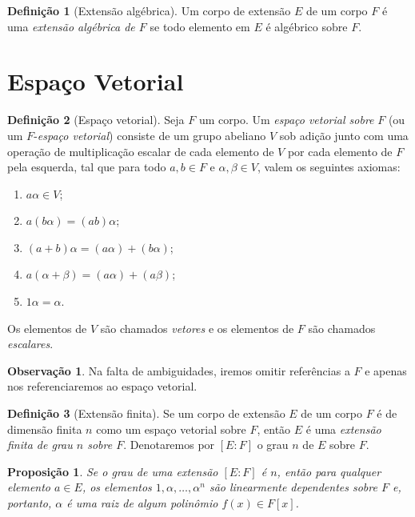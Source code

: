 \documentclass[a4paper,12pt]{report}
\theoremstyle{plain}
\newtheorem{proposicao}{Proposição}[section]
\theoremstyle{definition}
\newtheorem{definicao}{Definição}[section]
\newtheorem{observacao}{Observação}[section]
\begin{document}
\begin{definicao}[Extensão algébrica]
	Um corpo de extensão $E$ de um corpo $F$ é uma \emph{extensão algébrica de $F$} se todo elemento em $E$ é algébrico sobre $F$.
\end{definicao}

\section{Espaço Vetorial}

 \begin{definicao}[Espaço vetorial]
	Seja $F$ um corpo. Um \emph{espaço vetorial sobre} $F$ (ou um $F$-\emph{espaço vetorial}) consiste de um grupo abeliano $V$ sob adição junto com uma operação de multiplicação escalar de cada elemento de $V$ por cada elemento de $F$ pela esquerda, tal que para todo $a,b\in F$ e $\alpha,\beta\in V$, valem os seguintes axiomas:
	\begin{enumerate}
		\item $a\alpha\in V$;
		\item $a(b\alpha) = (ab)\alpha$;
		\item $(a+b)\alpha = (a\alpha)+(b\alpha)$;
		\item $a(\alpha+\beta) = (a\alpha)+(a\beta)$;
		\item $1\alpha = \alpha$.
	\end{enumerate}
	Os elementos de $V$ são chamados \emph{vetores} e os elementos de $F$ são chamados \emph{escalares}.
\end{definicao}

\begin{observacao}
	Na falta de ambiguidades, iremos omitir referências a $F$ e apenas nos referenciaremos ao espaço vetorial.
\end{observacao}

\begin{definicao}[Extensão finita]
	Se um corpo de extensão $E$ de um corpo $F$ é de dimensão finita $n$ como um espaço vetorial sobre $F$, então $E$ é uma \emph{extensão finita de grau $n$ sobre $F$}. Denotaremos por $[E:F]$ o grau $n$ de $E$ sobre $F$.
\end{definicao}

\begin{proposicao}
	Se o grau de uma extensão $[E:F]$ é $n$, então para qualquer elemento $a\in E$, os elementos $1,\alpha,\dots,\alpha^n$ são linearmente dependentes sobre $F$ e, portanto, $\alpha$ é uma raiz de algum polinômio $f(x)\in F[x]$.
\end{proposicao}
\end{document}
